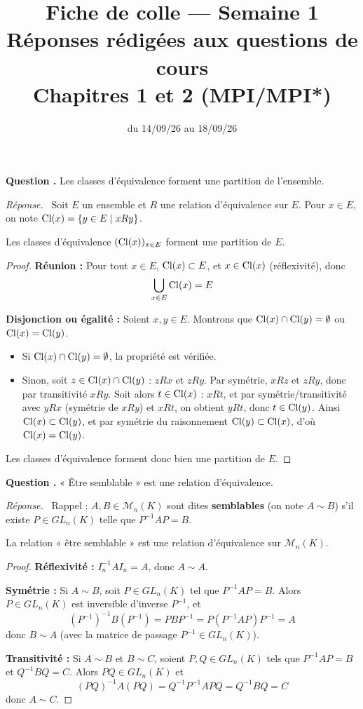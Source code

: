 \documentclass[11pt]{article}
\title{Fiche de colle --- Semaine 1\\ \large Réponses rédigées aux questions de cours\\ Chapitres 1 et 2 (MPI/MPI*)}
\author{}
\date{du 14/09/26 au 18/09/26}
\newcounter{qnum}
\newcommand{\question}[1]{%
\stepcounter{qnum}%
\bigskip
\noindent\textbf{Question \theqnum.} #1\par}
\newcommand{\reponse}{\noindent\textit{Réponse.}\ }
\begin{document}
\maketitle

\question{Les classes d'équivalence forment une partition de l'ensemble.}
\reponse
Soit $E$ un ensemble et $R$ une relation d'équivalence sur $E$. Pour $x\in E$, on note $\operatorname{Cl}(x)=\{y\in E \mid xRy\}$.

\begin{prop}
Les classes d'équivalence $(\operatorname{Cl}(x))_{x\in E}$ forment une partition de $E$.
\end{prop}

\begin{proof}
\textbf{Réunion :} Pour tout $x\in E$, $\operatorname{Cl}(x)\subset E$, et $x\in \operatorname{Cl}(x)$ (réflexivité), donc
\[\bigcup_{x\in E} \operatorname{Cl}(x) = E\]

\textbf{Disjonction ou égalité :} Soient $x,y\in E$. Montrons que $\operatorname{Cl}(x)\cap \operatorname{Cl}(y)=\emptyset$ ou $\operatorname{Cl}(x)=\operatorname{Cl}(y)$.
\begin{itemize}
\item Si $\operatorname{Cl}(x)\cap \operatorname{Cl}(y)=\emptyset$, la propriété est vérifiée.
\item Sinon, soit $z\in \operatorname{Cl}(x)\cap \operatorname{Cl}(y)$ : $zRx$ et $zRy$. Par symétrie, $xRz$ et $zRy$, donc par transitivité $xRy$. Soit alors $t\in \operatorname{Cl}(x)$ : $xRt$, et par symétrie/transitivité avec $yRx$ (symétrie de $xRy$) et $xRt$, on obtient $yRt$, donc $t\in \operatorname{Cl}(y)$. Ainsi $\operatorname{Cl}(x)\subset \operatorname{Cl}(y)$, et par symétrie du raisonnement $\operatorname{Cl}(y)\subset \operatorname{Cl}(x)$, d'où $\operatorname{Cl}(x)=\operatorname{Cl}(y)$.
\end{itemize}
Les classes d'équivalence forment donc bien une partition de $E$.
\end{proof}

\question{« Être semblable » est une relation d'équivalence.}
\reponse
Rappel : $A,B\in\mathcal{M}_n(K)$ sont dites \textbf{semblables} (on note $A\sim B$) s'il existe $P\in GL_n(K)$ telle que $P^{-1}AP=B$.

\begin{prop}
La relation « être semblable » est une relation d'équivalence sur $\mathcal{M}_n(K)$.
\end{prop}

\begin{proof}
\textbf{Réflexivité :} $I_n^{-1}AI_n = A$, donc $A\sim A$.

\textbf{Symétrie :} Si $A\sim B$, soit $P\in GL_n(K)$ tel que $P^{-1}AP=B$. Alors $P\in GL_n(K)$ est inversible d'inverse $P^{-1}$, et
\[(P^{-1})^{-1} B (P^{-1}) = PBP^{-1} = P(P^{-1}AP)P^{-1} = A\]
donc $B\sim A$ (avec la matrice de passage $P^{-1}\in GL_n(K)$).

\textbf{Transitivité :} Si $A\sim B$ et $B\sim C$, soient $P,Q\in GL_n(K)$ tels que $P^{-1}AP=B$ et $Q^{-1}BQ=C$. Alors $PQ\in GL_n(K)$ et
\[(PQ)^{-1}A(PQ) = Q^{-1}P^{-1}APQ = Q^{-1}BQ = C\]
donc $A\sim C$.
\end{proof}
\end{document}
